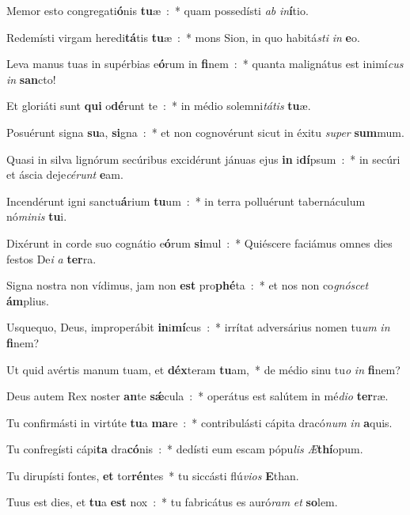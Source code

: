 ﻿\item Memor esto congregati\textbf{ó}nis \textbf{tu}æ~:~* quam possedísti \emph{ab} \emph{in}\textbf{í}tio.
\item Redemísti virgam heredi\textbf{tá}tis \textbf{tu}æ~:~* mons Sion, in quo habitá\emph{sti} \emph{in} \textbf{e}o.
\item Leva manus tuas in supérbias e\textbf{ó}rum in \textbf{fi}nem~:~* quanta malignátus est inimí\emph{cus} \emph{in} \textbf{san}cto!
\item Et gloriáti sunt \textbf{qui} o\textbf{dé}runt te~:~* in médio solemni\emph{tá}\emph{tis} \textbf{tu}æ.
\item Posuérunt signa \textbf{su}a, \textbf{si}gna~:~* et non cognovérunt sicut in éxitu \emph{su}\emph{per} \textbf{sum}mum.
\item Quasi in silva lignórum secúribus excidérunt jánuas ejus \textbf{in} i\textbf{dí}psum~:~* in secúri et áscia deje\emph{cé}\emph{runt} \textbf{e}am.
\item Incendérunt igni sanctu\textbf{á}rium \textbf{tu}um~:~* in terra polluérunt tabernáculum nó\emph{mi}\emph{nis} \textbf{tu}i.
\item Dixérunt in corde suo cognátio e\textbf{ó}rum \textbf{si}mul~:~* Quiéscere faciámus omnes dies festos De\emph{i} \emph{a} \textbf{ter}ra.
\item Signa nostra non vídimus, jam non \textbf{est} pro\textbf{phé}ta~:~* et nos non co\emph{gnó}\emph{scet} \textbf{ám}plius.
\item Usquequo, Deus, improperábit \textbf{in}i\textbf{mí}cus~:~* irrítat adversárius nomen tu\emph{um} \emph{in} \textbf{fi}nem?
\item Ut quid avértis manum tuam, et \textbf{déx}teram \textbf{tu}am,~* de médio sinu tu\emph{o} \emph{in} \textbf{fi}nem?
\item Deus autem Rex noster \textbf{an}te \textbf{sǽ}cula~:~* operátus est salútem in mé\emph{di}\emph{o} \textbf{ter}ræ.
\item Tu confirmásti in virtúte \textbf{tu}a \textbf{ma}re~:~* contribulásti cápita dracó\emph{num} \emph{in} \textbf{a}quis.
\item Tu confregísti cápi\textbf{ta} dra\textbf{có}nis~:~* dedísti eum escam pópu\emph{lis} \emph{Æ}\textbf{thí}opum.
\item Tu dirupísti fontes, \textbf{et} tor\textbf{rén}tes~* tu siccásti flú\emph{vi}\emph{os} \textbf{E}than.
\item Tuus est dies, et \textbf{tu}a \textbf{est} nox~:~* tu fabricátus es auró\emph{ram} \emph{et} \textbf{so}lem.
